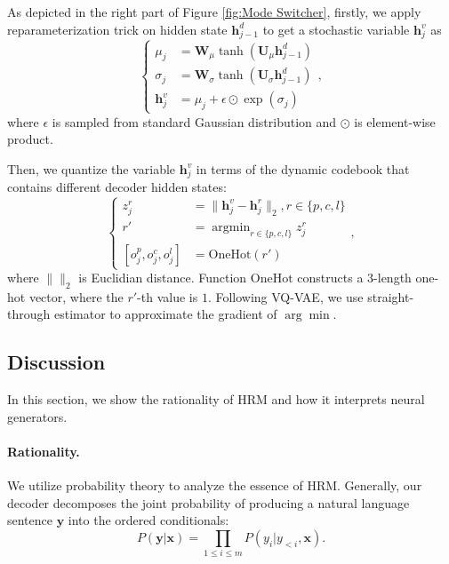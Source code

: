 \documentclass[letterpaper]{article} %
\begin{document}
	As depicted in the right part of Figure \ref{fig:Mode Switcher}, firstly, we apply reparameterization trick on hidden state $\mathbf{h}^d_{j-1}$ to get a stochastic variable $\mathbf{h}^v_j$ as
	\begin{equation}
	\left\{\begin{aligned}
	\mu_j & = \mathbf{W}_{\mu}\tanh(\mathbf{U}_{\mu}\mathbf{h}^d_{j-1}) \\
	\sigma_j & = \mathbf{W}_{\sigma}\tanh(\mathbf{U}_{\sigma}\mathbf{h}^d_{j-1}) \\
	\mathbf{h}^v_j & = \mu_j + \epsilon \odot \exp(\sigma_j)
	\end{aligned}\right.,
	\end{equation}
	where $\epsilon$ is sampled from standard Gaussian distribution and $\odot$ is element-wise product.

	Then, we quantize the variable $\mathbf{h}^v_j$ in terms of the dynamic codebook that contains different decoder hidden states:
	\begin{equation}
	\left\{\begin{aligned}
	z_j^r & = \| \mathbf{h}^v_j  - \mathbf{h}^r_j  \|_2, r \in \{p, c, l\} \\
	r' & = \mathop{\arg\min}_{r \in \{p, c, l\}} z_j^r \\
	[ o_j^p, o_j^c, o_j^l ] & = \mathrm{OneHot}(r')
	\end{aligned}\right.,
	\end{equation}
	where $\|\|_2$ is Euclidian distance. Function $\mathrm{OneHot}$ constructs a $3$-length one-hot vector, where the $r'$-th value is $1$. Following VQ-VAE, we use straight-through estimator to approximate the gradient of $\arg\min$.

	\subsection{Discussion}
	\label{sec:Discussion}

	In this section, we show the rationality of HRM and how it interprets neural generators.

	\paragraph{Rationality.} We utilize probability theory to analyze the essence of HRM. Generally, our decoder decomposes the joint probability of producing a natural language sentence $\mathbf{y}$ into the ordered conditionals:
	\begin{equation}
	P(\mathbf{y} | \mathbf{x}) = \prod_{1 \le i \le m} P(y_i | y_{<i}, \mathbf{x}).
	\end{equation}
\end{document}
